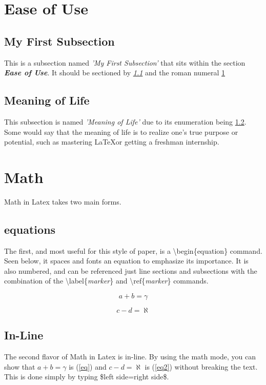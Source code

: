 \documentclass[conference]{IEEEtran}
\begin{document}
\section{Ease of Use}\label{Ease}

\subsection{My First Subsection}\label{first}
This is a subsection named \textit{'My First Subsection'} that sits within the section \textbf{\textit{Ease of Use}}. It should be sectioned by \textit{\ref{first}} and the roman numeral \ref{Ease}

\subsection{Meaning of Life}\label{meaning}
This subsection is named \textit{'Meaning of Life'} due to its enumeration being \ref{meaning}. Some would say that the meaning of life is to realize one's true purpose or potential, such as mastering \LaTeX or getting a freshman internship.

\section{Math}
Math in Latex takes two main forms. 

\subsection{equations}
The first, and most useful for this style of paper, is a \textbackslash begin\{equation\} command. Seen below, it spaces and fonts an equation to emphasize its importance. It is also numbered, and can be referenced just line sections and subsections with the combination of the \textbackslash label\{\textit{marker}\} and \textbackslash ref\{\textit{marker}\} commands.

\begin{equation}
a+b=\gamma\label{eq}
\end{equation}

\begin{equation}
c-d=\aleph\label{eq2}
\end{equation}

\subsection{In-Line}
The second flavor of Math in Latex is in-line. By using the math mode, you can show that $a+b=\gamma$ is (\ref{eq}) and $c-d=\aleph$ is (\ref{eq2}) without breaking the text. This is done simply by typing \$left side=right side\$.
\end{document}
